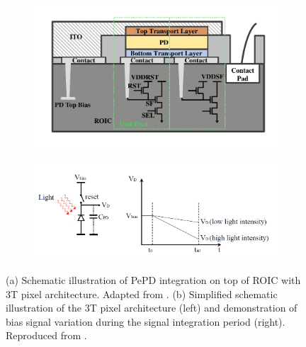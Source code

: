\begin{figure}[htbp]
    \centering
    \begin{subfigure}[t]{0.6\textwidth} %
        \centering
        \includegraphics[width=\textwidth]{chapters/introduction/image/imager_cross_section.pdf} %
        \caption{}
        \label{}
    \end{subfigure}
    \hfill %
    \begin{subfigure}[t]{0.99\textwidth} %
        \centering
        \includegraphics[width=\textwidth]{chapters/introduction/image/3T_pixel_readout.png} %
        \caption{}
        \label{}
    \end{subfigure}

    \caption[Cross-section and operation of an image sensor with 3T pixel architecture.]{(a) Schematic illustration of PePD integration on top of ROIC with 3T pixel architecture. Adapted from \cite{Kim2022DetailedSensors}. (b) Simplified schematic illustration of the 3T pixel architecture (left) and demonstration of bias signal variation during the signal integration period (right). Reproduced from \cite{Pejovic2023ColloidalInfrared}.}
    \label{fig:ch1:cmos_roic}
\end{figure}




